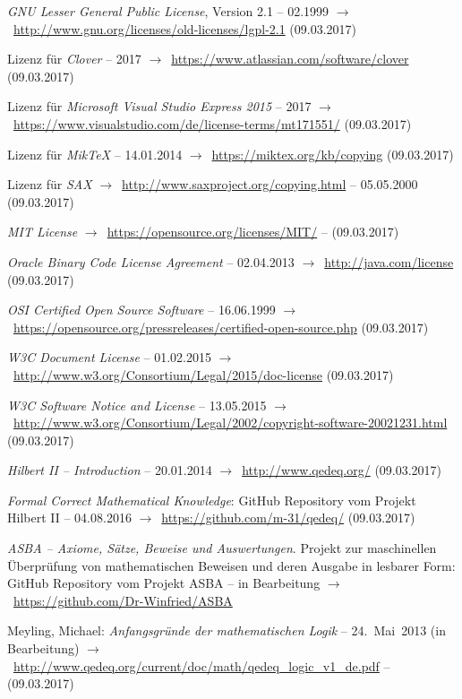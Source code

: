 \documentclass[english,ngerman,parskip=half,headsepline,footsepline,
	fleqn,notitlepage]{scrreprt}
\newcommand*{\tourl}[1]{$\rightarrow$~\url{#1}}
\begin{document}
\begin{flushleft}
\begin{thebibliography}{12}
			\emph{GNU Lesser General Public License},
			Version 2.1 -- 02.1999
			\tourl{http://www.gnu.org/licenses/old-licenses/lgpl-2.1}
			(09.03.2017)

			Lizenz für \emph{Clover}
			-- 2017
			\tourl{https://www.atlassian.com/software/clover}
			(09.03.2017)

			Lizenz
			für \emph{Microsoft Visual Studio Express 2015}
			-- 2017
			\tourl{https://www.visualstudio.com/de/license-terms/mt171551/}
			(09.03.2017)

			Lizenz für \emph{MikTeX}
			-- 14.01.2014
			\tourl{https://miktex.org/kb/copying}
			(09.03.2017)

			Lizenz für \emph{SAX}
			\tourl{http://www.saxproject.org/copying.html}
			-- 05.05.2000 (09.03.2017)

			\emph{MIT License}
			\tourl{https://opensource.org/licenses/MIT/}
			-- (09.03.2017)

			\emph{Oracle Binary Code License Agreement}
			-- 02.04.2013
			\tourl{http://java.com/license}
			(09.03.2017)

			\emph{OSI Certified Open Source Software}
			-- 16.06.1999
			\tourl{https://opensource.org/pressreleases/certified-open-source.php}
			(09.03.2017)

			\emph{W3C Document License} -- 01.02.2015
			\tourl{http://www.w3.org/Consortium/Legal/2015/doc-license}
			(09.03.2017)

			\emph{W3C Software Notice and License}
			-- 13.05.2015
			\tourl{http://www.w3.org/Consortium/Legal/2002/copyright-software-20021231.html}
			(09.03.2017)

			\emph{Hilbert II -- Introduction}
			-- 20.01.2014
			\tourl{http://www.qedeq.org/}
			(09.03.2017)

			\emph{Formal Correct Mathematical Knowledge}:
			GitHub Repository vom Projekt Hilbert II
			-- 04.08.2016
			\tourl{https://github.com/m-31/qedeq/}
			(09.03.2017)

			\emph{ASBA
			-- Axiome, Sätze, Beweise und Auswertungen}.
			Projekt zur maschinellen Überprüfung von mathematischen Beweisen
			und deren Ausgabe in lesbarer Form:
			GitHub Repository vom Projekt ASBA
			-- in Bearbeitung
			\tourl{https://github.com/Dr-Winfried/ASBA}

			Meyling, Michael:
			\emph{Anfangsgründe der mathematischen Logik}
			-- 24.~Mai~2013 (in Bearbeitung)
			\tourl{http://www.qedeq.org/current/doc/math/qedeq\_logic\_v1\_de.pdf}
			-- (09.03.2017)


\end{thebibliography}
\end{flushleft}
\end{document}
